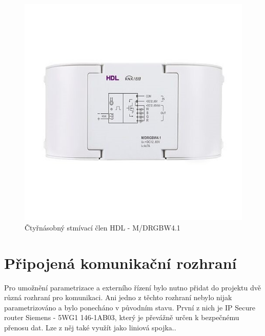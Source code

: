 \begin{figure}[!ht]
  \begin{center}
    \includegraphics[scale=0.4]{obrazky/HLD aktor2.jpg}
  \end{center}
  \caption[Čtyřnásobný stmívací člen HDL - M/DRGBW4.1 \cite{HDL aktor2}]{Čtyřnásobný stmívací člen HDL - M/DRGBW4.1 \cite{HDL aktor2}}
  \label{fig:Čtyřnásobný stmívací člen HDL - M/DRGBW4.1}
\end{figure}

\section{Připojená komunikační rozhraní}
Pro umožnění parametrizace a externího řízení bylo nutno přidat do projektu dvě různá rozhraní pro komunikaci. Ani jedno z těchto rozhraní nebylo nijak parametrizováno a bylo ponecháno v původním stavu. První z nich je IP Secure router Siemens - 5WG1 146-1AB03, který je převážně určen k bezpečnému přenosu dat. Lze z něj také využít jako liniová spojka.. \cite{Siemens IP}

